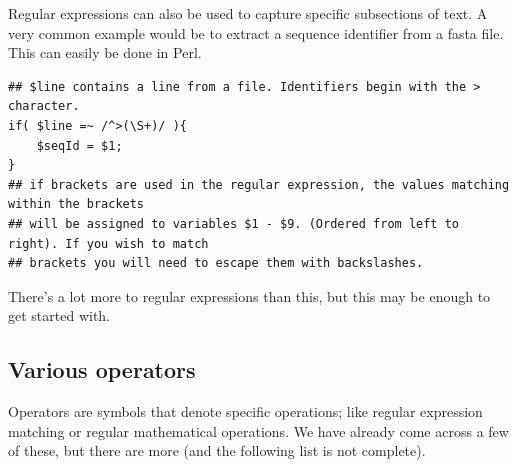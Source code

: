 \documentclass[11pt]{article}
\begin{document}
Regular expressions can also be used to capture specific subsections of
text. A very common example would be to extract a sequence identifier
from a fasta file. This can easily be done in Perl.

\begin{verbatim}
## $line contains a line from a file. Identifiers begin with the > character.
if( $line =~ /^>(\S+)/ ){
    $seqId = $1;
}
## if brackets are used in the regular expression, the values matching within the brackets
## will be assigned to variables $1 - $9. (Ordered from left to right). If you wish to match
## brackets you will need to escape them with backslashes.
\end{verbatim}

There's a lot more to regular expressions than this, but this may be enough to get
started with.

\subsection{Various operators}
\label{sec-5-7}

Operators are symbols that denote specific operations; like regular
expression matching or regular mathematical operations. We have already
come across a few of these, but there are more (and the following list
is not complete).
\end{document}
